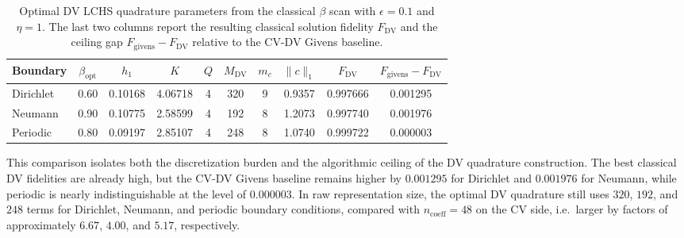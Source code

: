 \begin{table}[h]
\centering
{\small
\caption{Optimal DV LCHS quadrature parameters from the classical $\beta$ scan with $\epsilon=0.1$ and $\eta=1$. The last two columns report the resulting classical solution fidelity $F_{\mathrm{DV}}$ and the ceiling gap $F_{\mathrm{givens}}-F_{\mathrm{DV}}$ relative to the CV-DV Givens baseline.}
\label{tab:dv_resource_compare}
\begin{tabular}{lccccccccc}
\toprule
Boundary & $\beta_{\mathrm{opt}}$ & $h_1$ & $K$ & $Q$ & $M_{\mathrm{DV}}$ & $m_c$ & $\|c\|_1$ & $F_{\mathrm{DV}}$ & $F_{\mathrm{givens}}-F_{\mathrm{DV}}$ \\
\midrule
Dirichlet & 0.60 & 0.10168 & 4.06718 & 4 & 320 & 9 & 0.9357 & 0.997666 & 0.001295 \\
Neumann & 0.90 & 0.10775 & 2.58599 & 4 & 192 & 8 & 1.2073 & 0.997740 & 0.001976 \\
Periodic & 0.80 & 0.09197 & 2.85107 & 4 & 248 & 8 & 1.0740 & 0.999722 & 0.000003 \\
\bottomrule
\end{tabular}}
\end{table}

This comparison isolates both the discretization burden and the algorithmic ceiling of the DV quadrature construction. The best classical DV fidelities are already high, but the CV-DV Givens baseline remains higher by $0.001295$ for Dirichlet and $0.001976$ for Neumann, while periodic is nearly indistinguishable at the level of $0.000003$. In raw representation size, the optimal DV quadrature still uses $320$, $192$, and $248$ terms for Dirichlet, Neumann, and periodic boundary conditions, compared with $n_{\mathrm{coeff}}=48$ on the CV side, i.e.\ larger by factors of approximately $6.67$, $4.00$, and $5.17$, respectively.

